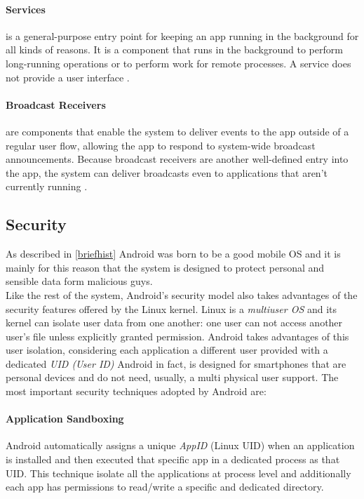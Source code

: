\paragraph{Services} is a general-purpose entry point for keeping an app running in the background for all kinds of reasons. It is a component that runs in the background to perform long-running operations or to perform work for remote processes. A service does not provide a user interface \cite{devandroifundamentals}. 

\paragraph{Broadcast Receivers} are components that enable the system to deliver events to the app outside of a regular user flow, allowing the app to respond to system-wide broadcast announcements. Because broadcast receivers are another well-defined entry into the app, the system can deliver broadcasts even to applications that aren't currently running \cite{devandroifundamentals}.

\subsection{Security}\label{androidsecurity}
\par
As described in \ref{briefhist} Android was born to be a good mobile OS and it is mainly for this reason that the system is designed to protect personal and sensible data form malicious guys.\\
Like the rest of the system, Android's security model also takes advantages of the security features offered by the Linux kernel. Linux is a \textit{multiuser OS} and its kernel can isolate user data from one another: one user can not access another user's file unless explicitly granted permission. Android takes advantages of this user isolation, considering each application a different user provided with a dedicated \textit{UID (User ID)} \cite{elenkov2014android} Android in fact, is designed for smartphones that are personal devices and do not need, usually, a multi physical user support.
The most important security techniques adopted by Android are:

	\paragraph{Application Sandboxing} Android automatically assigns a unique \textit{AppID} (Linux UID) when an application is installed and then executed that specific app in a dedicated process as that UID. This technique isolate all the applications at process level and additionally each app has permissions to read/write a specific and dedicated directory.
	
